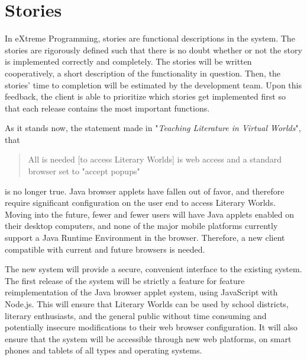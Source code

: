 \documentclass[12pt, letterpaper]{report}
\begin{document}
%
\chapter{Stories}
\par
In eXtreme Programming, stories are functional descriptions in the system. The stories are rigorously defined such that there is no doubt whether or not the story is implemented correctly and completely. The stories will be written cooperatively, a short description of the functionality in question. Then, the stories' time to completion will be estimated by the development team. Upon this feedback, the client is able to prioritize which stories get implemented first so that each release contains the most important functions.

\par
As it stands now, the statement made in "\textit{Teaching Literature in Virtual Worlds}", that 

\begin{quotation}
All is needed [to access Literary Worlds] is web access and a standard browser set to "accept popups" \cite[9]{Webb}
\end{quotation}
is no longer true. Java browser applets have fallen out of favor, and therefore require significant configuration on the user end to access Literary Worlds. Moving into the future, fewer and fewer users will have Java applets enabled on their desktop computers, and none of the major mobile platforms currently support a Java Runtime Environment in the browser. Therefore, a new client compatible with current and future browsers is needed.

\par
The new system will provide a secure, convenient interface to the existing system. The first release of the system will be strictly a feature for feature reimplementation of the Java browser applet system, using JavaScript with Node.js. This will ensure that Literary Worlds can be used by school districts, literary enthusiasts, and the general public without time consuming and potentially insecure modifications to their web browser configuration. It will also ensure that the system will be accessible through new web platforms, on smart phones and tablets of all types and operating systems.
\end{document}
